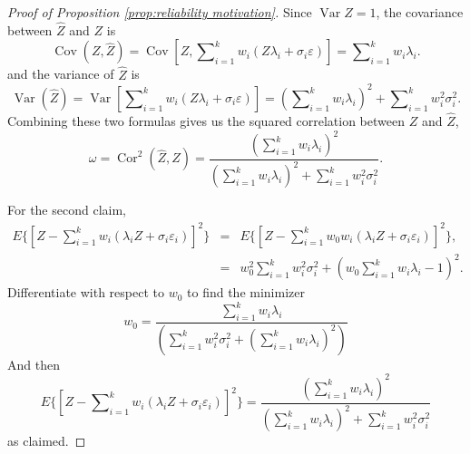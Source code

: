 \documentclass[twoside]{article}
\DeclareMathOperator{\Var}{Var}
\DeclareMathOperator{\Cor}{Cor}
\DeclareMathOperator{\Cov}{Cov}
\DeclareMathOperator{\tsum}{\textstyle \sum}
\begin{document}
\begin{proof}[Proof of Proposition \ref{prop:reliability motivation}]\label{proof:reliability motivation}
Since $\Var Z=1$, the covariance between $\hat{Z}$ and $Z$
is
\begin{equation}
\Cov(Z,\hat{Z})=\Cov[Z,{\textstyle\tsum_{i=1}^{k}w_{i}}(Z\lambda_{i}+\sigma_{i}\varepsilon)]  =  {\textstyle\tsum_{i=1}^{k}w_{i}}\lambda_{i}.
\end{equation}
and the variance of $\hat{Z}$ is
\[
\Var(\hat{Z})=\Var[{\textstyle\tsum_{i=1}^{k}}w_{i}(Z\lambda_{i}+\sigma_{i}\varepsilon)]
=({\textstyle\tsum_{i=1}^{k}}w_{i}\lambda_{i})^{2}+\tsum_{i=1}^{k}w_{i}^{2}\sigma_{i}^{2}.
\]
Combining these two formulas gives us the squared correlation between
$Z$ and $\hat{Z}$,
\begin{equation}
\omega=\Cor^{2}(\hat{Z},Z) = \frac{(\tsum_{i=1}^{k}w_{i}\lambda_{i})^{2}}{(\tsum_{i=1}^{k}w_{i}\lambda_{i})^{2}+\tsum_{i=1}^{k}w_{i}^{2}\sigma_{i}^{2}}.
\end{equation}

For the second claim,
\begin{eqnarray*}
E\{ [Z-\tsum_{i=1}^{k}w_{i}(\lambda_{i}Z+\sigma_{i}\varepsilon_{i})]^{2}\}  & = & E\{ [Z-\tsum_{i=1}^{k}w_{0}w_{i}(\lambda_{i}Z+\sigma_{i}\varepsilon_{i})]^{2}\} ,\\
 & = & w_{0}^{2}\tsum_{i=1}^{k}w_{i}^{2}\sigma_{i}^{2}+(w_{0}\tsum_{i=1}^{k}w_{i}\lambda_{i}-1)^{2}.
\end{eqnarray*}
Differentiate with respect to $w_{0}$ to find the minimizer
\[
w_{0}=\frac{\tsum_{i=1}^{k}w_{i}\lambda_{i}}{(\tsum_{i=1}^{k}w_{i}^{2}\sigma_{i}^{2}+(\tsum_{i=1}^{k}w_{i}\lambda_{i})^{2})}
\]
And then
\[
E\{[Z-\tsum_{i=1}^{k}w_{i}(\lambda_{i}Z+\sigma_{i}\varepsilon_{i})]^{2}\} =\frac{(\tsum_{i=1}^{k}w_{i}\lambda_{i})^{2}}{(\tsum_{i=1}^{k}w_{i}\lambda_{i})^{2}+\tsum_{i=1}^{k}w_{i}^{2}\sigma_{i}^{2}}
\]
as claimed.
\end{proof}
\end{document}
